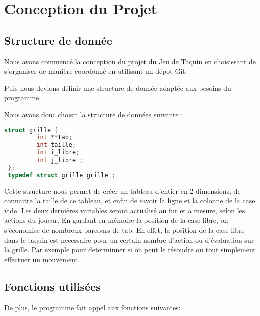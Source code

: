 \documentclass{article}
\begin{document}
\section{Conception du Projet}
\subsection{Structure de donnée}

Nous avons commencé la conception du projet du Jeu de Taquin en choisissant de s'organiser de manière coordonné en utilisant un dépot Git.

Puis nous devions définir une structure de donnée adaptée aux besoins du programme.

Nous avons donc choisit la structure de données suivante :

\begin{lstlisting}[language=C]
struct grille { 
         int **tab;
         int taille;
         int i_libre;
         int j_libre ;
 };  
 typedef struct grille grille ;
\end{lstlisting}

Cette structure nous permet de créer un tableau d'entier en 2 dimensions, de connaitre la taille de ce tableau, et enfin de savoir la ligne et la colonne de la case vide. Les deux dernières variables seront actualisé au fur et a mesure, selon les actions du joueur. En gardant en mémoire la position de la case libre, on s'économise de nombreux parcours de tab. En effet, la position de la case libre dans le taquin est necessaire pour un certain nombre d'action ou d'évaluation sur la grille. Par exemple pour determinner si on peut le résoudre ou tout simplement effectuer un mouvement.

\subsection{Fonctions utilisées}

De plus, le programme fait appel aux fonctions suivantes:
\end{document}
